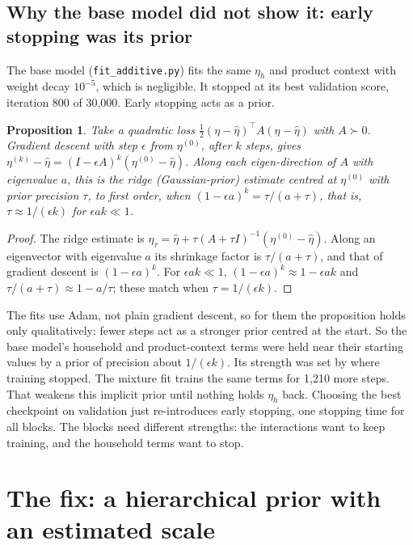 \documentclass[11pt]{article}
\newtheorem{proposition}{Proposition}
\theoremstyle{remark}\newtheorem{remark}{Remark}
\begin{document}
\subsection{Why the base model did not show it: early stopping was its prior}
The base model (\texttt{fit\_additive.py}) fits the same $\eta_h$ and product context with weight
decay $10^{-5}$, which is negligible. It stopped at its best validation score, iteration 800 of
30{,}000. Early stopping acts as a prior.
\begin{proposition}\label{prop:es}
Take a quadratic loss $\tfrac12(\eta-\hat\eta)^\top A(\eta-\hat\eta)$ with $A\succ0$. Gradient descent
with step $\epsilon$ from $\eta^{(0)}$, after $k$ steps, gives
$\eta^{(k)}-\hat\eta=(I-\epsilon A)^k(\eta^{(0)}-\hat\eta)$. Along each eigen-direction of $A$ with
eigenvalue $a$, this is the ridge (Gaussian-prior) estimate centred at $\eta^{(0)}$ with prior
precision $\tau$, to first order, when $(1-\epsilon a)^k=\tau/(a+\tau)$, that is, $\tau\approx 1/(\epsilon k)$ for $\epsilon a k\ll1$.
\end{proposition}
\begin{proof}
The ridge estimate is $\eta_\tau=\hat\eta+\tau(A+\tau I)^{-1}(\eta^{(0)}-\hat\eta)$. Along an
eigenvector with eigenvalue $a$ its shrinkage factor is $\tau/(a+\tau)$, and that of gradient descent
is $(1-\epsilon a)^k$. For $\epsilon a k\ll 1$, $(1-\epsilon a)^k\approx1-\epsilon ak$ and
$\tau/(a+\tau)\approx 1-a/\tau$; these match when $\tau=1/(\epsilon k)$.
\end{proof}
\noindent The fits use Adam, not plain gradient descent, so for them the proposition holds only
qualitatively: fewer steps act as a stronger prior centred at the start.
So the base model's household and product-context terms were held near their starting
values by a prior of precision about $1/(\epsilon k)$. Its strength was set by where training stopped.
The mixture fit trains the same terms for 1{,}210 more steps. That weakens this implicit prior
until nothing holds $\eta_h$ back. Choosing the best checkpoint on validation just re-introduces
early stopping, one stopping time for all blocks. The blocks need different strengths: the
interactions want to keep training, and the household terms want to stop.

\section{The fix: a hierarchical prior with an estimated scale}
\end{document}

